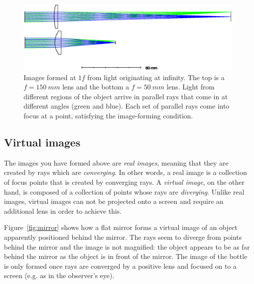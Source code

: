 \documentclass[a4paper]{report}
\begin{document}
    
    \begin{figure}[h]
    \center
    \includegraphics[width=6in]{figures/lens_f_comparison.eps}
    \caption{Images formed at $1f$ from light originating at infinity. 
    The top is a $f=150~mm$ lens and the bottom a $f=50~mm$ lens.
    Light from different regions of the object arrive in parallel rays that come in at different angles (green and blue). 
    Each set of parallel rays come into focus at a point, satisfying the image-forming condition. }
    \label{fig:outside}
    \end{figure}

	
    \subsection{Virtual images}
    \hypertarget{hintBack-virtual}{}
    The images you have formed above are \emph{real images}, meaning that they are created by rays which are \emph{converging}.
    In other words, a real image is a collection of focus points that is created by converging rays. 
    A \emph{virtual image}, on the other hand, is composed of a collection of points whose rays are \emph{diverging}.
    Unlike real images, virtual images can not be projected onto a screen and require an additional lens in order to achieve this. 
    
    Figure~\ref{fig:mirror} shows how a flat mirror forms a virtual image of an object apparently positioned behind the mirror. 
    The rays seem to diverge from points behind the mirror and the image is not magnified: the object appears to be as far behind the mirror as the object is in front of the mirror.
    The image of the bottle is only formed once rays are converged by a positive lens and focused on to a screen (e.g. as in the observer's eye).
\end{document}
